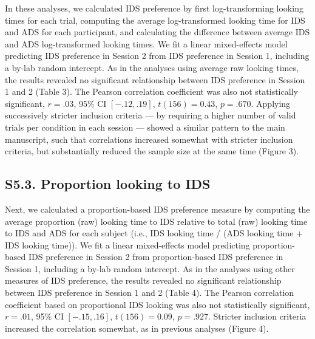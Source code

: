 \documentclass[
  man, donotrepeattitle,floatsintext]{apa6}
\begin{document}
In these analyses, we calculated IDS preference by first log-transforming looking times for each trial, computing the average log-transformed looking time for IDS and ADS for each participant, and calculating the difference between average IDS and ADS log-transformed looking times.
We fit a linear mixed-effects model predicting IDS preference in Session 2 from IDS preference in Session 1, including a by-lab random intercept.
As in the analyses using average raw looking times, the results revealed no significant relationship between IDS preference in Session 1 and 2 (Table 3).
The Pearson correlation coefficient was also not statistically significant, \(r = .03\), 95\% CI \([-.12, .19]\), \(t(156) = 0.43\), \(p = .670\).
Applying successively stricter inclusion criteria --- by requiring a higher number of valid trials per condition in each session --- showed a similar pattern to the main manuscript, such that correlations increased somewhat with stricter inclusion criteria, but substantially reduced the sample size at the same time (Figure 3).

\hypertarget{s5.3.-proportion-looking-to-ids}{%
\subsection{S5.3. Proportion looking to IDS}\label{s5.3.-proportion-looking-to-ids}}

Next, we calculated a proportion-based IDS preference measure by computing the average proportion (raw) looking time to IDS relative to total (raw) looking time to IDS and ADS for each subject (i.e., IDS looking time / (ADS looking time + IDS looking time)).
We fit a linear mixed-effects model predicting proportion-based IDS preference in Session 2 from proportion-based IDS preference in Session 1, including a by-lab random intercept.
As in the analyses using other measures of IDS preference, the results revealed no significant relationship between IDS preference in Session 1 and 2 (Table 4).
The Pearson correlation coefficient based on proportional IDS looking was also not statistically significant, \(r = .01\), 95\% CI \([-.15, .16]\), \(t(156) = 0.09\), \(p = .927\).
Stricter inclusion criteria increased the correlation somewhat, as in previous analyses (Figure 4).
\end{document}

